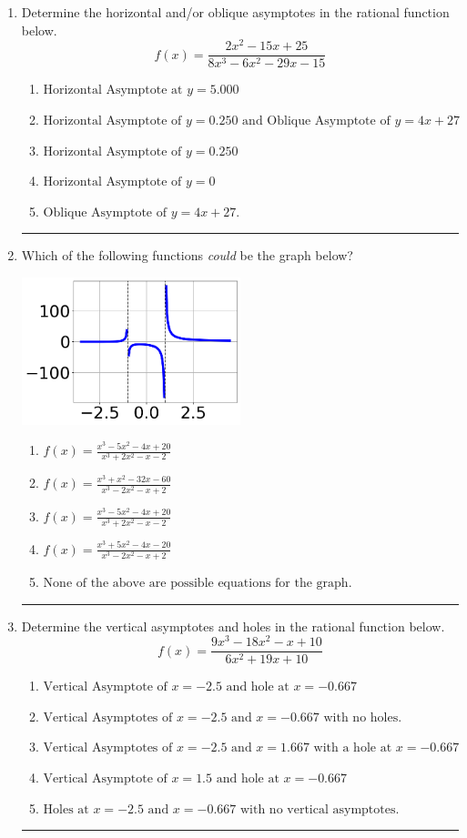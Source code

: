 \documentclass[14pt]{extbook}
\newcommand{\litem}[1]{\item#1\hspace*{-1cm}\rule{\textwidth}{0.4pt}}
\begin{document}
\begin{enumerate}
{\begin{enumerate}[label=\Alph*.]
\end{enumerate} }
\litem{
Determine the horizontal and/or oblique asymptotes in the rational function below.\[ f(x) = \frac{2x^{2} -15 x + 25}{8x^{3} -6 x^{2} -29 x -15} \]\begin{enumerate}[label=\Alph*.]
\item \( \text{Horizontal Asymptote at } y = 5.000 \)
\item \( \text{Horizontal Asymptote of } y = 0.250 \text{ and Oblique Asymptote of } y = 4x + 27 \)
\item \( \text{Horizontal Asymptote of } y = 0.250  \)
\item \( \text{Horizontal Asymptote of } y = 0 \)
\item \( \text{Oblique Asymptote of } y = 4x + 27. \)

\end{enumerate} }
\litem{
Which of the following functions \textit{could} be the graph below?
\begin{center}
    \includegraphics[width=0.5\textwidth]{../Figures/identifyGraphOfRationalFunctionCopyB.png}
\end{center}
\begin{enumerate}[label=\Alph*.]
\item \( f(x)=\frac{x^{3} -5 x^{2} -4 x + 20}{x^{3} +2 x^{2} -x -2} \)
\item \( f(x)=\frac{x^{3} + x^{2} -32 x -60}{x^{3} -2 x^{2} -x + 2} \)
\item \( f(x)=\frac{x^{3} -5 x^{2} -4 x + 20}{x^{3} +2 x^{2} -x -2} \)
\item \( f(x)=\frac{x^{3} +5 x^{2} -4 x -20}{x^{3} -2 x^{2} -x + 2} \)
\item \( \text{None of the above are possible equations for the graph.} \)

\end{enumerate} }
\litem{
Determine the vertical asymptotes and holes in the rational function below.\[ f(x) = \frac{9x^{3} -18 x^{2} -x + 10}{6x^{2} +19 x + 10} \]\begin{enumerate}[label=\Alph*.]
\item \( \text{Vertical Asymptote of } x = -2.5 \text{ and hole at } x = -0.667 \)
\item \( \text{Vertical Asymptotes of } x = -2.5 \text{ and } x = -0.667 \text{ with no holes.} \)
\item \( \text{Vertical Asymptotes of } x = -2.5 \text{ and } x = 1.667 \text{ with a hole at } x = -0.667 \)
\item \( \text{Vertical Asymptote of } x = 1.5 \text{ and hole at } x = -0.667 \)
\item \( \text{Holes at } x = -2.5 \text{ and } x = -0.667 \text{ with no vertical asymptotes.} \)


\end{enumerate}}
\end{enumerate}
\end{document}
